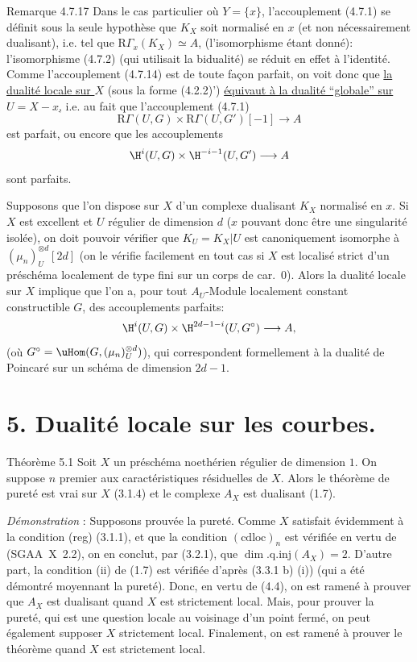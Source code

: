 \begin{statement}{Remarque 4.7.17}
Dans le cas particulier où $Y=\{x\}$, l'accouplement (4.7.1) se définit sous la seule hypothèse que $K_X$ soit normalisé en $x$ (et non nécessairement dualisant), i.e. tel que $\mathrm{R}\Gamma_x(K_X)\simeq A$, (l'isomorphisme étant donné): l'isomorphisme (4.7.2) (qui utilisait la bidualité) se réduit en effet à l'identité. Comme l'accouplement (4.7.14) est de toute façon parfait, on voit donc que \underline{la dualité locale sur $X$} (sous la forme (4.2.2)') \underline{équivaut à la dualité ``globale'' sur $U=X-x$,} i.e. au fait que l'accouplement (4.7.1)
\[
\mathrm{R}\Gamma(U,G)\times\mathrm{R}\Gamma(U,G')[-1]\longrightarrow A
\]
est parfait, ou encore que les accouplements
\[
\H^i(U,G)\times\H^{-i-1}(U,G')\longrightarrow A
\]
sont parfaits.

Supposons que l'on dispose sur $X$ d'un complexe dualisant $K_X$ normalisé en $x$. Si $X$ est excellent et $U$ régulier de dimension $d$ ($x$ pouvant donc être une singularité isolée), on doit pouvoir vérifier que $K_U=K_X|U$ est canoniquement isomorphe à $(\mu_n)_U^{\otimes d}[2d]$ (on le vérifie facilement en tout cas si $X$ est localisé strict d'un préschéma localement de type fini sur un corps de car.~0). Alors la dualité locale sur $X$ implique que l'on a, pour tout $A_U$-Module localement constant constructible $G$, des accouplements parfaits:
\[
\H^i(U,G)\times\H^{2d-1-i}(U,G^\circ)\longrightarrow A,
\]
(où $G^\circ=\uHom(G,(\mu_n)_U^{\otimes d})$), qui correspondent formellement à la dualité de Poincaré sur un schéma de dimension $2d-1$.
\end{statement}

\section*{5. Dualité locale sur les courbes.}

\begin{statement}{Théorème 5.1}
Soit $X$ un préschéma noethérien régulier de dimension $1$. On suppose $n$ premier aux caractéristiques résiduelles de $X$. Alors le théorème de pureté est vrai sur $X$ (3.1.4) et le complexe $A_X$ est dualisant (1.7).
\end{statement}

\emph{Démonstration} : Supposons prouvée la pureté. Comme $X$ satisfait évidemment à la condition (reg) (3.1.1), et que la condition $(\mathrm{cdloc})_n$ est vérifiée en vertu de (SGAA~X~2.2), on en conclut, par (3.2.1), que $\dim.\mathrm{q.inj}(A_X)=2$. D'autre part, la condition (ii) de (1.7) est vérifiée d'après (3.3.1 b) (i)) (qui a été démontré moyennant la pureté). Donc, en vertu de (4.4), on est ramené à prouver que $A_X$ est dualisant quand $X$ est strictement local. Mais, pour prouver la pureté, qui est une question locale au voisinage d'un point fermé, on peut également supposer $X$ strictement local. Finalement, on est ramené à prouver le théorème quand $X$ est strictement local.


